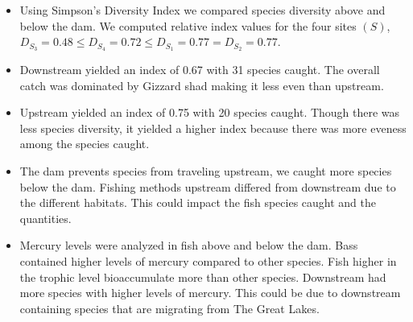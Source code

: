 \documentclass[b0paper,margin=1cm,landscape]{baposter}
\begin{document}
\begin{poster}
{  \begin{itemize} \normalsize 
    \item Using Simpson's Diversity Index we compared species diversity above and below the dam. 
    We computed relative index values for the four sites $(S)$,  $D_{S_{3}} = 0.48 \le D_{S_{4}} = 0.72 \le D_{S_{1}} = 0.77 = D_{S_{2}} = 0.77$. \\
    \item Downstream yielded an index of 0.67 with 31 species caught. 
    The overall catch was dominated by Gizzard shad making it less even than upstream.
    \item Upstream yielded an index of 0.75 with 20 species caught. 
    Though there was less species diversity, it yielded a higher index because there was more eveness among the species caught.   
    \item The dam prevents species from traveling upstream, we caught more species below the dam. 
    Fishing methods upstream differed from downstream due to the different habitats. 
    This could impact the fish species caught and the quantities.
    \item Mercury levels were analyzed in fish above and below the dam.
    Bass contained higher levels of mercury compared to other species. 
    Fish higher in the trophic level bioaccumulate more than other species. 
    Downstream had more species with higher levels of mercury. 
    This could be due to downstream containing species that are migrating from The Great Lakes.
  \end{itemize}
}
\end{poster}
\end{document}
